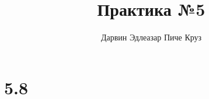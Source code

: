 \documentclass{article}
\title{Практика №5}
\author{Дарвин Эдлеазар Пиче Круз}
\begin{document}
\maketitle

\section*{5.8}
\end{document}
